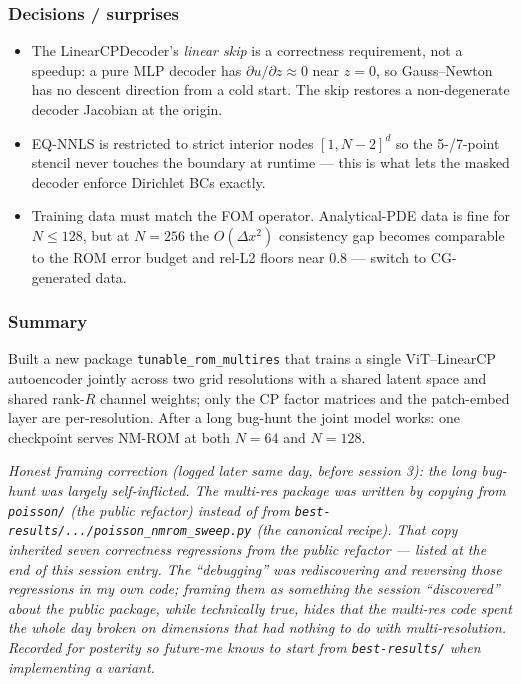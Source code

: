 \subsubsection*{Decisions / surprises}
\begin{itemize}
  \item The LinearCPDecoder's \textit{linear skip} is a correctness
        requirement, not a speedup: a pure MLP decoder has $\partial u/\partial z
        \approx 0$ near $z=0$, so Gauss--Newton has no descent direction from a
        cold start. The skip restores a non-degenerate decoder Jacobian at the
        origin.
  \item EQ-NNLS is restricted to strict interior nodes $[1, N{-}2]^d$ so the
        5-/7-point stencil never touches the boundary at runtime --- this is
        what lets the masked decoder enforce Dirichlet BCs exactly.
  \item Training data must match the FOM operator. Analytical-PDE data is fine
        for $N \leq 128$, but at $N=256$ the $O(\Delta x^2)$ consistency gap
        becomes comparable to the ROM error budget and rel-L2 floors near 0.8 ---
        switch to CG-generated data.
\end{itemize}


\subsubsection*{Summary}
Built a new package \texttt{tunable\_rom\_multires} that trains a single
ViT--LinearCP autoencoder jointly across two grid resolutions with a shared
latent space and shared rank-$R$ channel weights; only the CP factor matrices
and the patch-embed layer are per-resolution. After a long bug-hunt the joint
model works: one checkpoint serves NM-ROM at both $N{=}64$ and $N{=}128$.

\textit{Honest framing correction (logged later same day, before session 3):
the long bug-hunt was largely self-inflicted. The multi-res package was
written by copying from \texttt{poisson/} (the public refactor) instead of
from \texttt{best-results/.../poisson\_nmrom\_sweep.py} (the canonical recipe).
That copy inherited seven correctness regressions from the public refactor
--- listed at the end of this session entry. The ``debugging'' was rediscovering
and reversing those regressions in my own code; framing them as something the
session ``discovered'' about the public package, while technically true, hides
that the multi-res code spent the whole day broken on dimensions that had
nothing to do with multi-resolution. Recorded for posterity so future-me knows
to start from \texttt{best-results/} when implementing a variant.}

